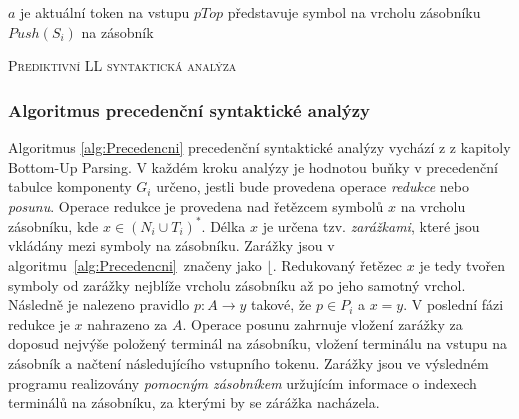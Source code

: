 \begin{algorithm}[H]
  \DontPrintSemicolon
  \SetAlgoNoLine
  \SetAlgoNoEnd

  \SetSideCommentLeft
  \LinesNumberedHidden

  \BlankLine

  \SetNlSty{}{}{:}
  \SetNlSkip{-1.1em}

  \Indp\Indpp


  $a$ je aktuální token na vstupu\;
  $pTop$ představuje symbol na vrcholu zásobníku\;
  \;
  \setcounter{AlgoLine}{0}
  \ShowLn $Push(S_i)$ na zásobník\;
  \ShowLn {}
  \caption{\textsc{Prediktivní LL syntaktická analýza}} \label{alg:LLPrediktivni}
\end{algorithm}

\subsubsection*{Algoritmus precedenční syntaktické analýzy}

Algoritmus \ref{alg:Precedencni} precedenční syntaktické analýzy vychází z \cite{VYPa:2022} z kapitoly Bottom-Up Parsing.
V každém kroku analýzy je hodnotou buňky v precedenční tabulce komponenty $G_i$ určeno, jestli bude provedena operace \emph{redukce} nebo
\emph{posunu}. Operace redukce je provedena nad řetězcem symbolů $x$ na vrcholu zásobníku, kde $x \in (N_i \cup T_i)^*$. Délka $x$ je
určena tzv. \emph{zarážkami}, které jsou vkládány mezi symboly na zásobníku. Zarážky jsou v algoritmu~\ref{alg:Precedencni}~značeny
jako $\lfloor$. Redukovaný řetězec $x$ je tedy tvořen symboly od zarážky nejblíže vrcholu zásobníku až po jeho samotný vrchol.
Následně je nalezeno pravidlo $p\!: A \rightarrow y$ takové, že $p \in P_i$ a $x = y$. V poslední fázi redukce je $x$ nahrazeno za $A$.
Operace posunu zahrnuje vložení zarážky za doposud nejvýše položený terminál na zásobníku, vložení terminálu na vstupu na zásobník a
načtení následujícího vstupního tokenu. Zarážky jsou ve výsledném programu realizovány \emph{pomocným zásobníkem} uržujícím informace
o indexech terminálů na zásobníku, za kterými by se zárážka nacházela.

